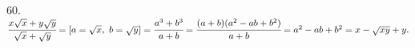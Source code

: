 60. $\cfrac{x\sqrt{x}+y\sqrt{y}}{\sqrt{x}+\sqrt{y}}=[a=\sqrt{x},\ b=\sqrt{y}]=
\cfrac{a^3+b^3}{a+b}=\cfrac{(a+b)(a^2-ab+b^2)}{a+b}=a^2-ab+b^2=x-\sqrt{xy}+y.$\\
